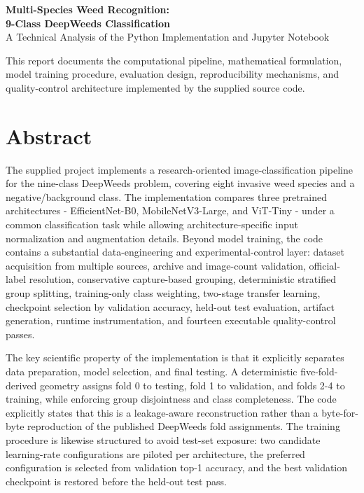 \documentclass[11pt,a4paper]{article}
\begin{document}
\begin{titlepage}
\centering
\vspace*{2.2cm}
{\LARGE\bfseries Multi-Species Weed Recognition:\\[0.35em] 9-Class DeepWeeds Classification}\\[1.1cm]
{\large A Technical Analysis of the Python Implementation and Jupyter Notebook}\\[2.0cm]
\vfill
\begin{minipage}{0.88\textwidth}
\centering
This report documents the computational pipeline, mathematical formulation, model training procedure, evaluation design, reproducibility mechanisms, and quality-control architecture implemented by the supplied source code.
\end{minipage}
\vfill
\end{titlepage}
\tableofcontents
\newpage
\section{Abstract}
The supplied project implements a research-oriented image-classification pipeline for the nine-class DeepWeeds problem, covering eight invasive weed species and a negative/background class. The implementation compares three pretrained architectures - EfficientNet-B0, MobileNetV3-Large, and ViT-Tiny - under a common classification task while allowing architecture-specific input normalization and augmentation details. Beyond model training, the code contains a substantial data-engineering and experimental-control layer: dataset acquisition from multiple sources, archive and image-count validation, official-label resolution, conservative capture-based grouping, deterministic stratified group splitting, training-only class weighting, two-stage transfer learning, checkpoint selection by validation accuracy, held-out test evaluation, artifact generation, runtime instrumentation, and fourteen executable quality-control passes.

The key scientific property of the implementation is that it explicitly separates data preparation, model selection, and final testing. A deterministic five-fold-derived geometry assigns fold 0 to testing, fold 1 to validation, and folds 2-4 to training, while enforcing group disjointness and class completeness. The code explicitly states that this is a leakage-aware reconstruction rather than a byte-for-byte reproduction of the published DeepWeeds fold assignments. The training procedure is likewise structured to avoid test-set exposure: two candidate learning-rate configurations are piloted per architecture, the preferred configuration is selected from validation top-1 accuracy, and the best validation checkpoint is restored before the held-out test pass.
\end{document}
